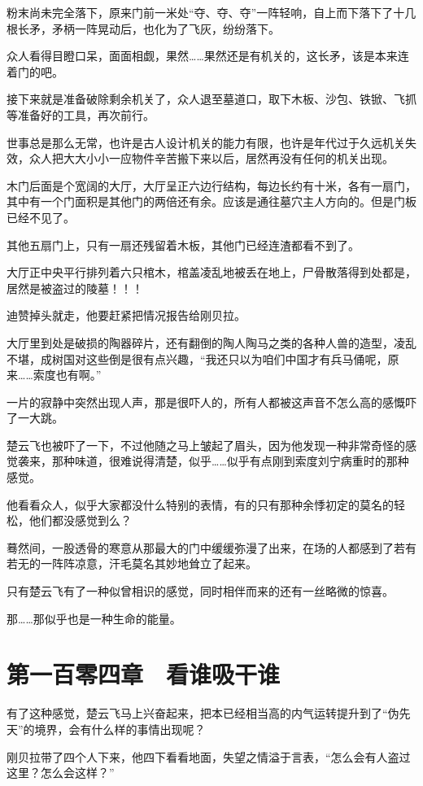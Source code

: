粉末尚未完全落下，原来门前一米处“夺、夺、夺”一阵轻响，自上而下落下了十几根长矛，矛柄一阵晃动后，也化为了飞灰，纷纷落下。

众人看得目瞪口呆，面面相觑，果然……果然还是有机关的，这长矛，该是本来连着门的吧。

接下来就是准备破除剩余机关了，众人退至墓道口，取下木板、沙包、铁锨、飞抓等准备好的工具，再次前行。

世事总是那么无常，也许是古人设计机关的能力有限，也许是年代过于久远机关失效，众人把大大小小一应物件辛苦搬下来以后，居然再没有任何的机关出现。

木门后面是个宽阔的大厅，大厅呈正六边行结构，每边长约有十米，各有一扇门，其中有一个门面积是其他门的两倍还有余。应该是通往墓穴主人方向的。但是门板已经不见了。

其他五扇门上，只有一扇还残留着木板，其他门已经连渣都看不到了。

大厅正中央平行排列着六只棺木，棺盖凌乱地被丢在地上，尸骨散落得到处都是，居然是被盗过的陵墓！！！

迪赞掉头就走，他要赶紧把情况报告给刚贝拉。

大厅里到处是破损的陶器碎片，还有翻倒的陶人陶马之类的各种人兽的造型，凌乱不堪，成树国对这些倒是很有点兴趣，“我还只以为咱们中国才有兵马俑呢，原来……索度也有啊。”

一片的寂静中突然出现人声，那是很吓人的，所有人都被这声音不怎么高的感慨吓了一大跳。

楚云飞也被吓了一下，不过他随之马上皱起了眉头，因为他发现一种非常奇怪的感觉袭来，那种味道，很难说得清楚，似乎……似乎有点刚到索度刘宁病重时的那种感觉。

他看看众人，似乎大家都没什么特别的表情，有的只有那种余悸初定的莫名的轻松，他们都没感觉到么？

蓦然间，一股透骨的寒意从那最大的门中缓缓弥漫了出来，在场的人都感到了若有若无的一阵阵凉意，汗毛莫名其妙地耸立了起来。

只有楚云飞有了一种似曾相识的感觉，同时相伴而来的还有一丝略微的惊喜。

那……那似乎也是一种生命的能量。

\section{第一百零四章　看谁吸干谁}

有了这种感觉，楚云飞马上兴奋起来，把本已经相当高的内气运转提升到了“伪先天”的境界，会有什么样的事情出现呢？

刚贝拉带了四个人下来，他四下看看地面，失望之情溢于言表，“怎么会有人盗过这里？怎么会这样？”

